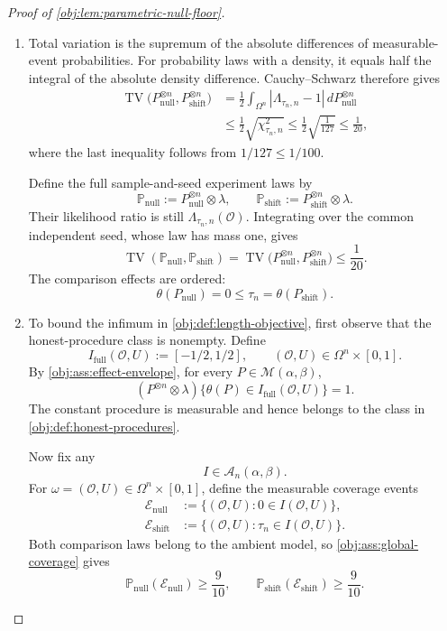 \documentclass[11pt]{article}
\begin{document}
\begin{proof}[Proof of \cref{obj:lem:parametric-null-floor}]
\begin{enumerate}
\item Total variation is the supremum of the absolute differences of measurable-event probabilities. For probability laws with a density, it equals half the integral of the absolute density difference. Cauchy--Schwarz therefore gives
\[
\begin{aligned}
\operatorname{TV}
\bigl(P_{\mathrm{null}}^{\otimes n},
      P_{\mathrm{shift}}^{\otimes n}\bigr)
&=
\frac12
\int_{\Omega^n}|\Lambda_{\tau_n,n}-1|
\,dP_{\mathrm{null}}^{\otimes n}\\
&\le
\frac12\sqrt{\chi^2_{\tau_n,n}}
\le
\frac12\sqrt{\frac1{127}}
\le
\frac1{20},
\end{aligned}
\]
where the last inequality follows from \(1/127\le1/100\).

Define the full sample-and-seed experiment laws by
\[
\mathbb P_{\mathrm{null}}
:=
P_{\mathrm{null}}^{\otimes n}\otimes\lambda,
\qquad
\mathbb P_{\mathrm{shift}}
:=
P_{\mathrm{shift}}^{\otimes n}\otimes\lambda.
\]
Their likelihood ratio is still \(\Lambda_{\tau_n,n}(\mathcal O)\). Integrating over the common independent seed, whose law has mass one, gives
\[
\operatorname{TV}
(\mathbb P_{\mathrm{null}},\mathbb P_{\mathrm{shift}})
=
\operatorname{TV}
\bigl(P_{\mathrm{null}}^{\otimes n},
      P_{\mathrm{shift}}^{\otimes n}\bigr)
\le\frac1{20}.
\]
The comparison effects are ordered:
\[
\theta(P_{\mathrm{null}})
=0
\le\tau_n
=\theta(P_{\mathrm{shift}}).
\]

\item To bound the infimum in \cref{obj:def:length-objective}, first observe that the honest-procedure class is nonempty. Define
\[
I_{\mathrm{full}}(\mathcal O,U):=[-1/2,1/2],
\qquad
(\mathcal O,U)\in\Omega^n\times[0,1].
\]
By \cref{obj:ass:effect-envelope}, for every
\(P\in\mathcal M(\alpha,\beta)\),
\[
(P^{\otimes n}\otimes\lambda)
\{\theta(P)\in I_{\mathrm{full}}(\mathcal O,U)\}=1.
\]
The constant procedure is measurable and hence belongs to the class in
\cref{obj:def:honest-procedures}.

Now fix any
\[
I\in\mathcal A_n(\alpha,\beta).
\]
For
\(\omega=(\mathcal O,U)\in\Omega^n\times[0,1]\), define the measurable coverage events
\[
\begin{aligned}
\mathcal E_{\mathrm{null}}
&:=
\{(\mathcal O,U):0\in I(\mathcal O,U)\},\\
\mathcal E_{\mathrm{shift}}
&:=
\{(\mathcal O,U):\tau_n\in I(\mathcal O,U)\}.
\end{aligned}
\]
Both comparison laws belong to the ambient model, so
\cref{obj:ass:global-coverage} gives
\[
\mathbb P_{\mathrm{null}}(\mathcal E_{\mathrm{null}})
\ge\frac9{10},
\qquad
\mathbb P_{\mathrm{shift}}(\mathcal E_{\mathrm{shift}})
\ge\frac9{10}.
\]


\end{enumerate}
\end{proof}
\end{document}
